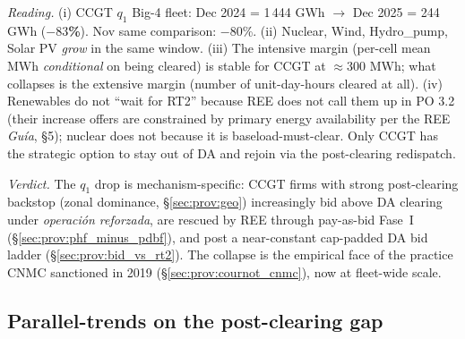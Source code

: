 \documentclass[11pt,a4paper]{article}
\begin{document}
\textit{Reading.} (i) CCGT $q_1$ Big-4 fleet: Dec 2024 = 1\,444 GWh $\to$ Dec 2025 = 244 GWh (\textbf{$-83$\%}). Nov same comparison: $-80$\%. (ii) Nuclear, Wind, Hydro\_pump, Solar PV \emph{grow} in the same window. (iii) The intensive margin (per-cell mean MWh \emph{conditional} on being cleared) is stable for CCGT at $\approx$300 MWh; what collapses is the extensive margin (number of unit-day-hours cleared at all). (iv) Renewables do not ``wait for RT2'' because REE does not call them up in PO 3.2 (their increase offers are constrained by primary energy availability per the REE \emph{Guía}, \S5); nuclear does not because it is baseload-must-clear. Only CCGT has the strategic option to stay out of DA and rejoin via the post-clearing redispatch.

\textit{Verdict.} The $q_1$ drop is mechanism-specific: CCGT firms with strong post-clearing backstop (zonal dominance, \S\ref{sec:prov:geo}) increasingly bid above DA clearing under \emph{operación reforzada}, are rescued by REE through pay-as-bid Fase~I (\S\ref{sec:prov:phf_minus_pdbf}), and post a near-constant cap-padded DA bid ladder (\S\ref{sec:prov:bid_vs_rt2}). The collapse is the empirical face of the practice CNMC sanctioned in 2019 (\S\ref{sec:prov:cournot_cnmc}), now at fleet-wide scale.

\subsection{Parallel-trends on the post-clearing gap}\label{sec:prov:q1_drop:parallel}
\end{document}
